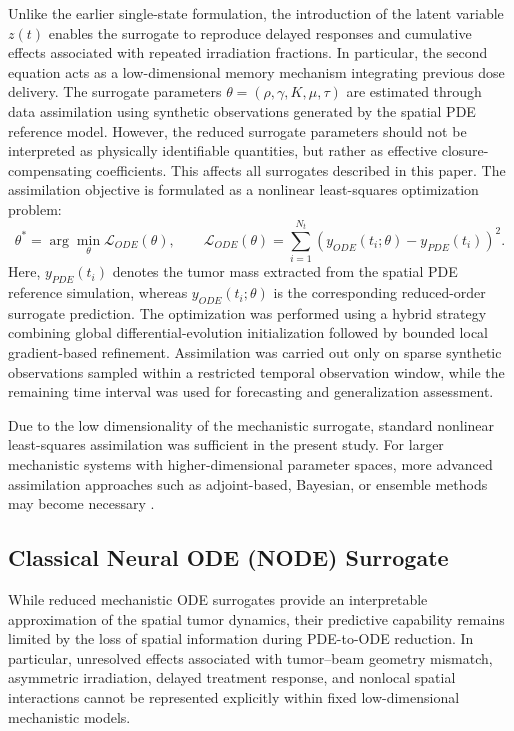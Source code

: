 Unlike the earlier single-state formulation, the introduction of the
latent variable \(z(t)\) enables the surrogate to reproduce delayed
responses and cumulative effects associated with repeated irradiation
fractions. In particular, the second equation acts as a low-dimensional
memory mechanism integrating previous dose delivery.
The surrogate parameters
$\theta =
(\rho,\gamma,K,\mu,\tau)$
are estimated through data assimilation \cite{heaney2024dataassimilation} using synthetic observations
generated by the spatial PDE reference model. However, the reduced surrogate parameters should not be interpreted as physically identifiable quantities, but rather as effective closure-compensating coefficients. This affects all surrogates described in this paper. The assimilation objective is formulated as a nonlinear least-squares
optimization problem:
\begin{equation}
\label{eq:ode_training}
\theta^{*}
=
\arg\min_{\theta}
\mathcal{L}_{ODE}(\theta),
\qquad
\mathcal{L}_{ODE}(\theta)
=
\sum_{i=1}^{N_t}
\left(
y_{ODE}(t_i;\theta)
-
y_{PDE}(t_i)
\right)^2.
\end{equation}
Here, \(y_{PDE}(t_i)\) denotes the tumor mass extracted from the spatial
PDE reference simulation, whereas
\(y_{ODE}(t_i;\theta)\) is the corresponding reduced-order surrogate
prediction.
The optimization was performed using a hybrid strategy combining global
differential-evolution initialization followed by bounded local
gradient-based refinement. Assimilation was carried out only on sparse
synthetic observations sampled within a restricted temporal observation
window, while the remaining time interval was used for forecasting and
generalization assessment.

Due to the low dimensionality of the mechanistic surrogate, standard
nonlinear least-squares assimilation was sufficient in the present
study. For larger mechanistic systems with higher-dimensional parameter
spaces, more advanced assimilation approaches such as adjoint-based,
Bayesian, or ensemble methods may become necessary
\cite{heaney2024dataassimilation}.
\subsection{Classical Neural ODE (NODE) Surrogate}

While reduced mechanistic ODE surrogates provide an interpretable
approximation of the spatial tumor dynamics, their predictive capability
remains limited by the loss of spatial information during PDE-to-ODE
reduction. In particular, unresolved effects associated with
tumor--beam geometry mismatch, asymmetric irradiation, delayed treatment
response, and nonlocal spatial interactions cannot be represented
explicitly within fixed low-dimensional mechanistic models.

